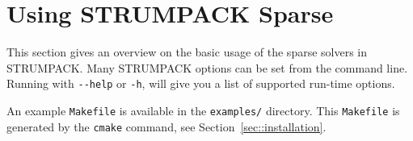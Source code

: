 \documentclass{article}
\begin{document}
\section{Using STRUMPACK Sparse}\label{sec:usage}
This section gives an overview on the basic usage of the sparse
solvers in STRUMPACK.
Many STRUMPACK options can be set from the command line. Running with
\lstinline[style=Bash]!--help! or \lstinline[style=Bash]!-h!, will
give you a list of supported run-time options.

An example \lstinline[style=Bash]!Makefile! is available in the
\lstinline[style=Bash]!examples/! directory. This
\lstinline[style=Bash]!Makefile! is generated by the
\lstinline[style=Bash]!cmake! command, see
Section~\ref{sec::installation}.
\end{document}
